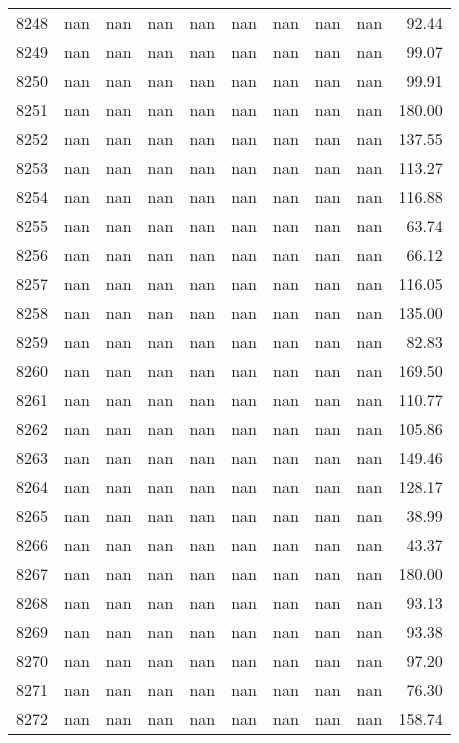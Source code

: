 \begin{tabular}{lrrrrrrrrr}
8248 & nan & nan & nan & nan & nan & nan & nan & nan & 92.44 \\
8249 & nan & nan & nan & nan & nan & nan & nan & nan & 99.07 \\
8250 & nan & nan & nan & nan & nan & nan & nan & nan & 99.91 \\
8251 & nan & nan & nan & nan & nan & nan & nan & nan & 180.00 \\
8252 & nan & nan & nan & nan & nan & nan & nan & nan & 137.55 \\
8253 & nan & nan & nan & nan & nan & nan & nan & nan & 113.27 \\
8254 & nan & nan & nan & nan & nan & nan & nan & nan & 116.88 \\
8255 & nan & nan & nan & nan & nan & nan & nan & nan & 63.74 \\
8256 & nan & nan & nan & nan & nan & nan & nan & nan & 66.12 \\
8257 & nan & nan & nan & nan & nan & nan & nan & nan & 116.05 \\
8258 & nan & nan & nan & nan & nan & nan & nan & nan & 135.00 \\
8259 & nan & nan & nan & nan & nan & nan & nan & nan & 82.83 \\
8260 & nan & nan & nan & nan & nan & nan & nan & nan & 169.50 \\
8261 & nan & nan & nan & nan & nan & nan & nan & nan & 110.77 \\
8262 & nan & nan & nan & nan & nan & nan & nan & nan & 105.86 \\
8263 & nan & nan & nan & nan & nan & nan & nan & nan & 149.46 \\
8264 & nan & nan & nan & nan & nan & nan & nan & nan & 128.17 \\
8265 & nan & nan & nan & nan & nan & nan & nan & nan & 38.99 \\
8266 & nan & nan & nan & nan & nan & nan & nan & nan & 43.37 \\
8267 & nan & nan & nan & nan & nan & nan & nan & nan & 180.00 \\
8268 & nan & nan & nan & nan & nan & nan & nan & nan & 93.13 \\
8269 & nan & nan & nan & nan & nan & nan & nan & nan & 93.38 \\
8270 & nan & nan & nan & nan & nan & nan & nan & nan & 97.20 \\
8271 & nan & nan & nan & nan & nan & nan & nan & nan & 76.30 \\
8272 & nan & nan & nan & nan & nan & nan & nan & nan & 158.74 \\

\end{tabular}
